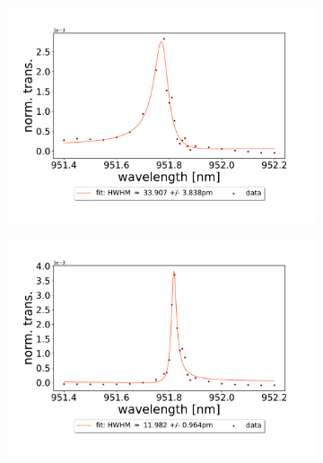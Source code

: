 \begin{figure}[h!]
    \centering
    \begin{subfigure}[b]{0.49\textwidth}
        \centering
        \includegraphics[width=\textwidth]{figures/results/single fano fits/60um_M5_fit_1.pdf}
        \caption{}
        \label{fig:short_single_fano_trans}
    \end{subfigure}
    \begin{subfigure}[b]{0.49\textwidth}
        \centering
        \includegraphics[width=\textwidth]{figures/results/single fano fits/220um_M5_fit_4.pdf}
        \caption{}
        \label{fig:long_single_fano_trans}
    \end{subfigure}
\end{figure}

